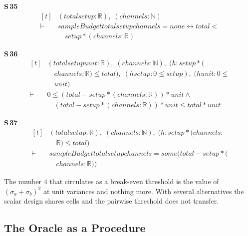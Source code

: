 \noindent\textbf{S\,35}\quad{}
{\footnotesize\[ \begin{aligned}[t]
&(\mathit{total} \mathit{setup} : \mathbb{R} ),\; (\mathit{channels} : \mathbb{N} )\\
\vdash\;&\mathit{sampleBudget} \mathit{total} \mathit{setup} \mathit{channels} = \mathit{none} \leftrightarrow \mathit{total} <\\
&\quad \mathit{setup} * (\mathit{channels} : \mathbb{R} )
\end{aligned} \]}

\noindent\textbf{S\,36}\quad{}
{\footnotesize\[ \begin{aligned}[t]
&(\mathit{total} \mathit{setup} \mathit{unit} : \mathbb{R} ),\; (\mathit{channels} : \mathbb{N} ),\; (\mathit{h} : \mathit{setup} * (\\
&\quad \mathit{channels} : \mathbb{R} ) \leq \mathit{total}),\; (\mathit{hsetup} : 0 \leq \mathit{setup}),\; (\mathit{hunit} : 0 \leq\\
&\quad \mathit{unit})\\
\vdash\;&0 \leq (\mathit{total} - \mathit{setup} * (\mathit{channels} : \mathbb{R} )) * \mathit{unit} \wedge\\
&\quad (\mathit{total} - \mathit{setup} * (\mathit{channels} : \mathbb{R} )) * \mathit{unit} \leq \mathit{total} * \mathit{unit}
\end{aligned} \]}

\noindent\textbf{S\,37}\quad{}
{\footnotesize\[ \begin{aligned}[t]
&(\mathit{total} \mathit{setup} : \mathbb{R} ),\; (\mathit{channels} : \mathbb{N} ),\; (\mathit{h} : \mathit{setup} * (\mathit{channels} :\\
&\quad \mathbb{R} ) \leq \mathit{total})\\
\vdash\;&\mathit{sampleBudget} \mathit{total} \mathit{setup} \mathit{channels} = \mathit{some} (\mathit{total} - \mathit{setup} * (\\
&\quad \mathit{channels} : \mathbb{R} ))
\end{aligned} \]}


The number $4$ that circulates as a break-even threshold is the value of
$(\sigma_{a}+\sigma_{b})^{2}$ at unit variances and nothing more. With several alternatives
the scalar design shares cells and the pairwise threshold does not transfer.

\subsection{The Oracle as a Procedure}
\label{sec:procedure}

